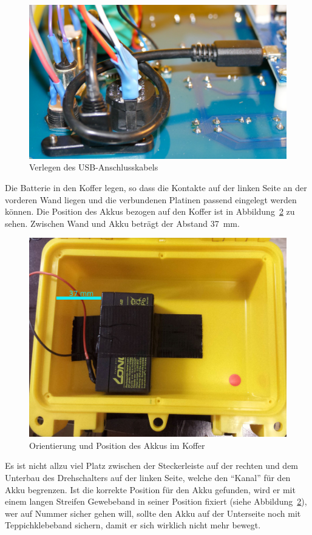 \documentclass[paper=a4, open=any, numbers=noenddot]{scrbook}
\begin{document}
			\begin{figure}
				\begin{center}
					\includegraphics[width=.8\textwidth]{usb-knoten}
				\end{center}
				\caption{Verlegen des USB-Anschlusskabels}
				\label{fig:usbknoten}
			\end{figure}

			Die Batterie in den Koffer legen, so dass die Kontakte auf der linken Seite an der vorderen Wand liegen und die verbundenen Platinen passend eingelegt werden können. Die Position des Akkus bezogen auf den Koffer ist in Abbildung~\ref{fig:akkuposition} zu sehen. Zwischen Wand und Akku beträgt der Abstand \SI{37}{\milli\metre}.

			\begin{figure}
				\centering\includegraphics[width=.8\textwidth]{Akkuposition}
				\caption{Orientierung und Position des Akkus im Koffer}
				\label{fig:akkuposition}
			\end{figure}

			Es ist nicht allzu viel Platz zwischen der Steckerleiste auf der rechten und dem Unterbau des Drehschalters auf der linken Seite, welche den \enquote{Kanal} für den Akku begrenzen. Ist die korrekte Position für den Akku gefunden, wird er mit einem langen Streifen Gewebeband in seiner Position fixiert (siehe Abbildung~\ref{fig:akkuposition}), wer auf Nummer sicher gehen will, sollte den Akku auf der Unterseite noch mit Teppichklebeband sichern, damit er sich wirklich nicht mehr bewegt.
\end{document}

